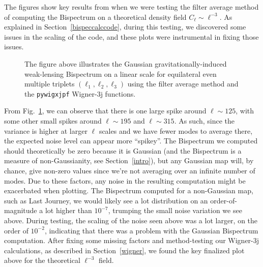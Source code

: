 \documentclass[11pt]{article}
\renewcommand{\_}[1]{\underline{ #1 }}
\begin{document}
{The figures show key results from when we were testing the filter average method of computing the Bispectrum on a theoretical density field $C_{\ell} \sim \ell^{-3}$. As explained in Section~\ref{bispeccalccode}, during this testing, we discovered some issues in the scaling of the code, and these plots were instrumental in fixing those issues.

\begin{figure}[H]
    \centering
    \caption{The figure above illustrates the Gaussian gravitationally-induced weak-lensing Bispectrum on a linear scale for equilateral even multiple triplets $(\ell_1, \ell_2, \ell_3)$ using the filter average method and the \texttt{pywigxjpf} Wigner-3j functions.}\label{fig:gauss_bispec_linear}
\end{figure}

From Fig.~\ref{fig:gauss_bispec_linear}, we can observe that there is one large spike around $\ell \sim 125$, with some other small spikes around $\ell \sim 195$ and $\ell \sim 315$. As such, since the variance is higher at larger $\ell$ scales and we have fewer modes to average there, the expected noise level can appear more ``spikey''. The Bispectrum we computed should theoretically be zero because it is Gaussian (and the Bispectrum is a measure of non-Gaussianity, see Section~\ref{intro}), but any Gaussian map will, by chance, give non-zero values since we're not averaging over an infinite number of modes. Due to these factors, any noise in the resulting computation might be exacerbated when plotting. The Bispectrum computed for a non-Gaussian map, such as Last Journey, we would likely see a lot distribution on an order-of-magnitude a lot higher than $10^{-7}$, trumping the small noise variation we see above. During testing, the scaling of the noise seen above was a lot larger, on the order of $10^{-2}$, indicating that there was a problem with the Gaussian Bispectrum computation. After fixing some missing factors and method-testing our Wigner-3j calculations, as described in Section~\ref{wigner}, we found the key finalized plot above for the theoretical $\ell^{-3}$ field.

}
\end{document}
